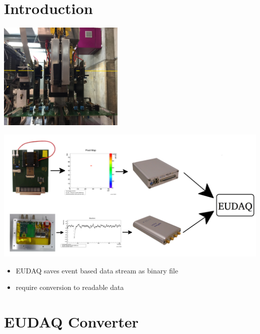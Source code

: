 \documentclass[9pt]{beamer}
\begin{document}
\section{Introduction}
\begin{frame}
	\begin{center}
		\includegraphics[width=6cm]{telescope3}
	\end{center}
\end{frame}
\begin{frame}
	\begin{center}
		\includegraphics[width=\textwidth]{Intro}
	\end{center}
	\begin{itemize}
		\item EUDAQ saves event based data stream as binary file
		\item require conversion to readable data
	\end{itemize}
\end{frame}
\section{EUDAQ Converter}
\end{document}
